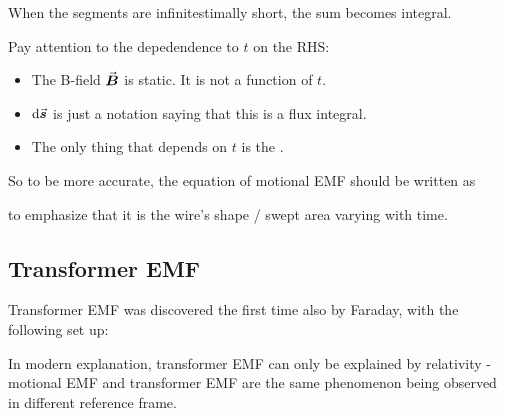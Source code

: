 \documentclass[class=article, crop=false, 12pt]{standalone}
\begin{document}
When the segments are infinitestimally short, the sum becomes integral.

Pay attention to the depedendence to $t$ on the RHS:
\begin{itemize}
    \item The B-field $\va*{B}$ is static. It is not a function of $t$.
    
    \item $\dd{\va*{s}}$ is just a notation saying that this is a flux integral. 

    \item The only thing that depends on $t$ is the .
\end{itemize}

So to be more accurate, the equation of motional EMF should be written as 

to emphasize that it is the wire's shape / swept area varying with time.



\subsection{Transformer EMF}

Transformer EMF was discovered the first time also by Faraday, 
with the following set up:


In modern explanation, 
transformer EMF can only be explained by relativity - 
motional EMF and transformer EMF are the same phenomenon being observed in different reference frame. 

\end{document}
